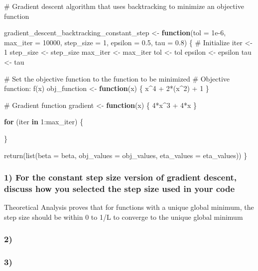 \documentclass[
  letterpaper,
  DIV=11,
  numbers=noendperiod]{scrartcl}
\newenvironment{Shaded}{\begin{snugshade}}{\end{snugshade}}
\newcommand{\AttributeTok}[1]{\textcolor[rgb]{0.40,0.45,0.13}{#1}}
\newcommand{\CommentTok}[1]{\textcolor[rgb]{0.37,0.37,0.37}{#1}}
\newcommand{\ControlFlowTok}[1]{\textcolor[rgb]{0.00,0.23,0.31}{\textbf{#1}}}
\newcommand{\DecValTok}[1]{\textcolor[rgb]{0.68,0.00,0.00}{#1}}
\newcommand{\FloatTok}[1]{\textcolor[rgb]{0.68,0.00,0.00}{#1}}
\newcommand{\FunctionTok}[1]{\textcolor[rgb]{0.28,0.35,0.67}{#1}}
\newcommand{\NormalTok}[1]{\textcolor[rgb]{0.00,0.23,0.31}{#1}}
\newcommand{\OtherTok}[1]{\textcolor[rgb]{0.00,0.23,0.31}{#1}}
\newcommand{\SpecialCharTok}[1]{\textcolor[rgb]{0.37,0.37,0.37}{#1}}
\begin{document}
\begin{Shaded}
\begin{Highlighting}[]
\CommentTok{\# Gradient descent algorithm that uses backtracking to minimize an objective function}

\NormalTok{gradient\_descent\_backtracking\_constant\_step }\OtherTok{\textless{}{-}} \ControlFlowTok{function}\NormalTok{(}\AttributeTok{tol =} \FloatTok{1e{-}6}\NormalTok{, }\AttributeTok{max\_iter =} \DecValTok{10000}\NormalTok{, }\AttributeTok{step\_size =} \DecValTok{1}\NormalTok{, }\AttributeTok{epsilon =} \FloatTok{0.5}\NormalTok{, }\AttributeTok{tau =} \FloatTok{0.8}\NormalTok{) \{}
  \CommentTok{\# Initialize}
\NormalTok{  iter }\OtherTok{\textless{}{-}} \DecValTok{1}
\NormalTok{  step\_size }\OtherTok{\textless{}{-}}\NormalTok{ step\_size}
\NormalTok{  max\_iter }\OtherTok{\textless{}{-}}\NormalTok{ max\_iter}
\NormalTok{  tol }\OtherTok{\textless{}{-}}\NormalTok{ tol}
\NormalTok{  epsilon }\OtherTok{\textless{}{-}}\NormalTok{ epsilon}
\NormalTok{  tau }\OtherTok{\textless{}{-}}\NormalTok{ tau}
  
  \CommentTok{\# Set the objective function to the function to be minimized }
  \CommentTok{\# Objective function: f(x)}
\NormalTok{  obj\_function }\OtherTok{\textless{}{-}} \ControlFlowTok{function}\NormalTok{(x) \{}
\NormalTok{    x}\SpecialCharTok{\^{}}\DecValTok{4} \SpecialCharTok{+} \DecValTok{2}\SpecialCharTok{*}\NormalTok{(x}\SpecialCharTok{\^{}}\DecValTok{2}\NormalTok{) }\SpecialCharTok{+} \DecValTok{1} 
\NormalTok{  \}}
  
  \CommentTok{\# Gradient function}
\NormalTok{  gradient }\OtherTok{\textless{}{-}} \ControlFlowTok{function}\NormalTok{(x) \{}
    \DecValTok{4}\SpecialCharTok{*}\NormalTok{x}\SpecialCharTok{\^{}}\DecValTok{3} \SpecialCharTok{+} \DecValTok{4}\SpecialCharTok{*}\NormalTok{x}
\NormalTok{  \}}
  
  \ControlFlowTok{for}\NormalTok{ (iter }\ControlFlowTok{in} \DecValTok{1}\SpecialCharTok{:}\NormalTok{max\_iter) \{}
    
\NormalTok{  \}}
  
  \FunctionTok{return}\NormalTok{(}\FunctionTok{list}\NormalTok{(}\AttributeTok{beta =}\NormalTok{ beta, }\AttributeTok{obj\_values =}\NormalTok{ obj\_values, }\AttributeTok{eta\_values =}\NormalTok{ eta\_values))}
\NormalTok{\}}
\end{Highlighting}
\end{Shaded}

\subsubsection{1) For the constant step size version of gradient
descent, discuss how you selected the step size used in your
code}\label{for-the-constant-step-size-version-of-gradient-descent-discuss-how-you-selected-the-step-size-used-in-your-code}

Theoretical Analysis proves that for functions with a unique global
minimum, the step size should be within 0 to 1/L to converge to the
unique global minimum

\subsubsection{2)}\label{section-1}

\subsubsection{3)}\label{section-2}
\end{document}
